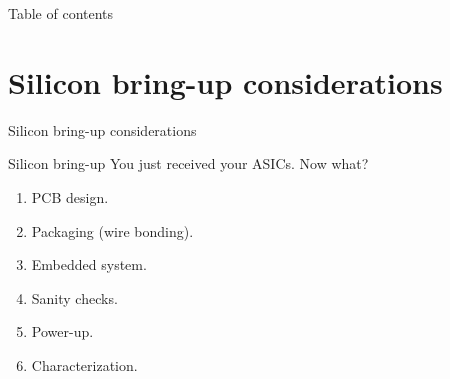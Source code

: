 \documentclass[aspectratio=169, t, 9pt]{beamer} %
\title[CMOS+X] %
{}
\subtitle{Silicon bring-up considerations}
\author[] %
{Llorenç Fanals-i-Batllori\inst{1,\textdagger} \\ \inst{1}SLAC National Accelerator Laboratory \\ \inst{\textdagger}\href{mailto:fanals@slac.stanford.edu}{fanals@slac.stanford.edu}}
\institute[SLAC] %
{
  \inst{1}%
  Faculty of Foo\\
  Bar University
  \and
  \inst{2}%
  Faculty of Baz\\
  Quz University
}
\date{2026/10/20}%
\begin{document}
\begin{frame}
\titlepage
\end{frame}


\begin{frame}[SloganTitleUnderline]{Table of contents}
    \LARGE \tableofcontents%
\end{frame}


\section{Silicon bring-up considerations}
\begin{frame}[SectionTitlepage]{Silicon bring-up considerations}
\end{frame}

\begin{frame}{Silicon bring-up}
    You just received your ASICs. Now what?
    \begin{enumerate}
        \item PCB design.
        \item Packaging (wire bonding).
        \item Embedded system.
        \item Sanity checks.
        \item Power-up.
        \item Characterization.
    \end{enumerate}
\end{frame}
\end{document}
